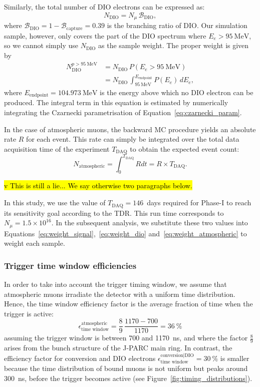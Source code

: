 Similarly, the total number of DIO electrons can be expressed as:
$$
N_\mathrm{DIO} = N_\mu \, \mathcal{B}_\mathrm{DIO},
$$
where $\mathcal{B}_\mathrm{DIO} = 1 - \mathcal{B}_\mathrm{capture} = 0.39$ is
the branching ratio of DIO. Our simulation sample, however, only covers the part
of the DIO spectrum where $E_e > \SI{95}{\MeV}$, so we cannot simply use
$N_\mathrm{DIO}$ as the sample weight. The proper weight is given by 
\begin{align}\label{eq:weight_dio}
N_\mathrm{DIO}^{p>\SI{95}{\MeV}} &= N_\mathrm{DIO} \, P(E_e > \SI{95}{\MeV}) \\\nonumber
&= N_\mathrm{DIO}\,\int_{\SI{95}{\MeV}}^{E_\mathrm{endpoint}} P(E_e)\,dE_e,
\end{align}
where $E_\mathrm{endpoint} = \SI{104.973}{\MeV}$ is the energy above which no
DIO electron can be produced. The integral term in this equation is estimated by
numerically integrating the Czarnecki parametrisation of
Equation~\ref{eq:czarnecki_param}.

In the case of atmospheric muons, the backward MC procedure yields an absolute
rate $R$ for each event. This rate can simply be integrated over the total
data acquisition time of the experiment $T_\mathrm{DAQ}$ to obtain the expected
event count:
\begin{equation}\label{eq:weight_atmospheric}
N_\mathrm{atmospheric} = \int_0^{T_\mathrm{DAQ}} R dt = R \times T_\mathrm{DAQ}.
\end{equation}

\hl{v This is still a lie... We say otherwise two paragraphs below.}

In this study, we use the value of $T_\mathrm{DAQ} = 146$~days required for
Phase-I to reach its sensitivity goal according to the TDR. This run time
corresponds to $N_\mu = 1.5 \times 10^{16}$. In the subsequent analysis, we
substitute these two values into
Equations~\ref{eq:weight_signal},~\ref{eq:weight_dio}
and~\ref{eq:weight_atmospheric} to weight each sample.



\subsubsection{Trigger time window efficiencies}
In order to take into account the trigger timing window, we assume that
atmospheric muons irradiate the detector with a uniform time distribution.
Hence, the time window efficiency factor is the average fraction of time when
the trigger is active:
$$
\epsilon_\text{time window}^\mathrm{atmospheric} =
\frac{8}{9}\,\frac{1170 - 700}{1170} = \SI{36}{\percent}
$$
assuming the trigger window is between 700 and \SI{1170}{\ns}, and where the
factor $\frac{8}{9}$ arises from the bunch structure of the J-PARC main ring. In
contrast, the efficiency factor for conversion and DIO electrons
$\epsilon_\text{time window}^\text{conversion|DIO} = \SI{30}{\percent}$ is
smaller because the time distribution of bound muons is not uniform but peaks
around \SI{300}{\ns}, before the trigger becomes active (see
Figure~\ref{fig:timing_distributions}).



